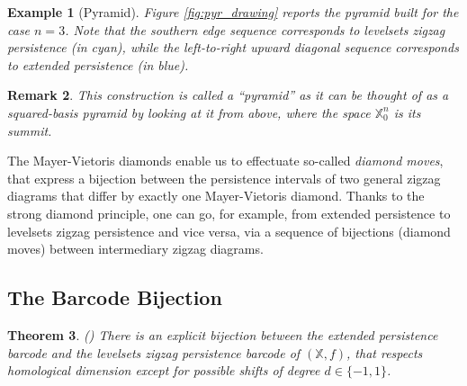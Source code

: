 \documentclass[11pt]{article}
\newtheorem{theorem}{Theorem}[section]
\newtheorem{remark}[theorem]{Remark}
\newtheorem{example}[theorem]{Example}
\theoremstyle{remark}
\newcommand{\X}{\mathbb{X}}
\begin{document}
\begin{example}[Pyramid] Figure \ref{fig:pyr_drawing} reports the pyramid built for the case $n=3$. Note that the southern edge sequence corresponds to levelsets zigzag persistence (in cyan), while the left-to-right upward diagonal sequence corresponds to extended persistence (in blue).

\end{example}

\begin{remark}
This construction is called a ``pyramid'' as it can be thought of as a squared-basis pyramid by looking at it from above, where the space $\X_0^n$ is its summit.
\end{remark}

\noindent The Mayer-Vietoris diamonds enable us to effectuate so-called \emph{diamond moves}, that express a bijection between the persistence intervals of two general zigzag diagrams that differ by exactly one Mayer-Vietoris diamond. Thanks to the strong diamond principle, one can go, for example, from extended persistence to levelsets zigzag persistence and vice versa, via a sequence of bijections (diamond moves) between intermediary zigzag diagrams.


\subsection{The Barcode Bijection}

\begin{theorem}(\autocite[Pyramid Theorem]{10.1145/1542362.1542408})
\label{pyr_theo}
There is an explicit bijection between the extended persistence barcode and the levelsets zigzag persistence barcode of $(\X,f)$, that respects homological dimension except for possible shifts of degree $d\in\{-1,1\}$.
\end{theorem}
\end{document}

